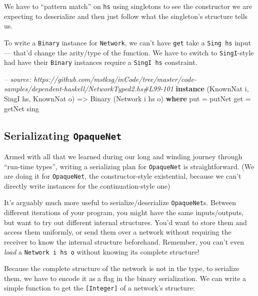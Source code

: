 \documentclass[]{article}
\newenvironment{Shaded}{}{}
\newcommand{\KeywordTok}[1]{\textcolor[rgb]{0.00,0.44,0.13}{\textbf{{#1}}}}
\newcommand{\DataTypeTok}[1]{\textcolor[rgb]{0.56,0.13,0.00}{{#1}}}
\newcommand{\CommentTok}[1]{\textcolor[rgb]{0.38,0.63,0.69}{\textit{{#1}}}}
\newcommand{\OtherTok}[1]{\textcolor[rgb]{0.00,0.44,0.13}{{#1}}}
\newcommand{\FunctionTok}[1]{\textcolor[rgb]{0.02,0.16,0.49}{{#1}}}
\newcommand{\NormalTok}[1]{{#1}}
\begin{document}
We have to ``pattern match'' on \texttt{hs} using singletons to see the
constructor we are expecting to deserialize and then just follow what the
singleton's structure tells us.

To write a \texttt{Binary} instance for \texttt{Network}, we can't have
\texttt{get} take a \texttt{Sing\ hs} input --- that'd change the arity/type of
the function. We have to switch to \texttt{SingI}-style had have their
\texttt{Binary} instances require a \texttt{SingI\ hs} constraint.

\begin{Shaded}
\begin{Highlighting}[]
\CommentTok{-- source: https://github.com/mstksg/inCode/tree/master/code-samples/dependent-haskell/NetworkTyped2.hs#L99-101}
\KeywordTok{instance} \NormalTok{(}\DataTypeTok{KnownNat} \NormalTok{i, }\DataTypeTok{SingI} \NormalTok{hs, }\DataTypeTok{KnownNat} \NormalTok{o) }\OtherTok{=>} \DataTypeTok{Binary} \NormalTok{(}\DataTypeTok{Network} \NormalTok{i hs o) }\KeywordTok{where}
    \NormalTok{put }\FunctionTok{=} \NormalTok{putNet}
    \NormalTok{get }\FunctionTok{=} \NormalTok{getNet sing}
\end{Highlighting}
\end{Shaded}

\subsection{\texorpdfstring{Serializating
\texttt{OpaqueNet}}{Serializating OpaqueNet}}\label{serializating-opaquenet}

Armed with all that we learned during our long and winding journey through
``run-time types'', writing a serializing plan for \texttt{OpaqueNet} is
straightforward. (We are doing it for \texttt{OpaqueNet}, the constructor-style
existential, because we can't directly write instances for the
continuation-style one)

It's arguably much more useful to serialize/deserialize \texttt{OpaqueNet}s.
Between different iterations of your program, you might have the same
inputs/outputs, but want to try out different internal structures. You'd want to
store them and access them uniformly, or send them over a network without
requiring the receiver to know the internal structure beforehand. Remember, you
can't even \emph{load} a \texttt{Network\ i\ hs\ o} without knowing its complete
structure!

Because the complete structure of the network is not in the type, to serialize
them, we have to encode it as a flag in the binary serialization. We can write a
simple function to get the \texttt{{[}Integer{]}} of a network's structure:
\end{document}
